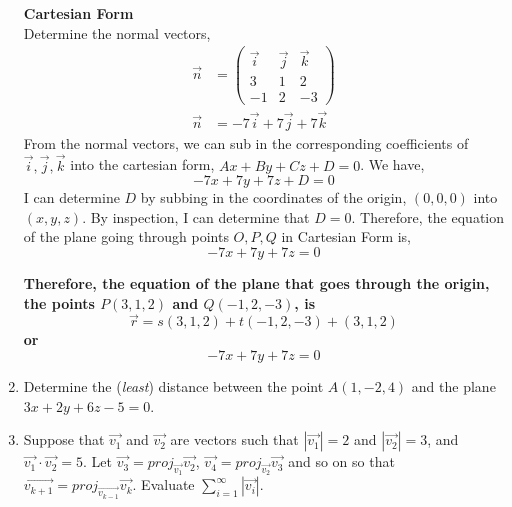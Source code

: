 \documentclass[12pt]{book}
\begin{document}
\begin{enumerate}
\textbf{Cartesian Form}\\
Determine the normal vectors,
\begin{align}
    \vec{n} &=
    \begin{pmatrix}
       \vec{i} & \vec{j} & \vec{k} \\
       3 & 1 & 2 \\
       -1 & 2 & -3
    \end{pmatrix}\\
    \vec{n} &= -7\vec{i} + 7\vec{j} + 7\vec{k}
\end{align}
From the normal vectors, we can sub in the corresponding coefficients of $\vec{i}, \vec{j}, \vec{k}$ into the cartesian form, $Ax+By+Cz+D=0$. We have,
$$-7x+7y+7z+D=0$$
I can determine $D$ by subbing in the coordinates of the origin, $(0,0,0)$ into $(x,y,z)$. By inspection, I can determine that $D=0$. Therefore, the equation of the plane going through points $O,P,Q$ in Cartesian Form is,
$$-7x+7y+7z=0$$

\textbf{Therefore, the equation of the plane that goes through the origin, the points $P(3,1,2)$ and $Q(-1,2,-3)$, is
$$\vec{r} = s(3,1,2)+t(-1,2,-3)+(3,1,2)$$
or
$$-7x+7y+7z=0$$}


\newpage


\item Determine the (\emph{least}) distance between the point $A(1,-2,4)$ and the plane $3x+2y+6z-5=0$.

\newpage

\setcounter{equation}{0}
\item Suppose that $\vec{v_1}$ and $\vec{v_2}$ are vectors such that $|\vec{v_1}|=2$ and $|\vec{v_2}| = 3$, and $\vec{v_1} \cdot \vec{v_2} = 5	$. Let $\vec{v_3} = proj_{\vec{v_1}}\vec{v_2}$, $\vec{v_4} = proj_{\vec{v_2}}\vec{v_3}$ and so on so that $\vec{v_{k+1}} = proj_{\vec{v_{k-1}}}\vec{v_k}$.  Evaluate $\sum\limits_{i=1}^{\infty} |\vec{v_i}|$.\\


\end{enumerate}
\end{document}
